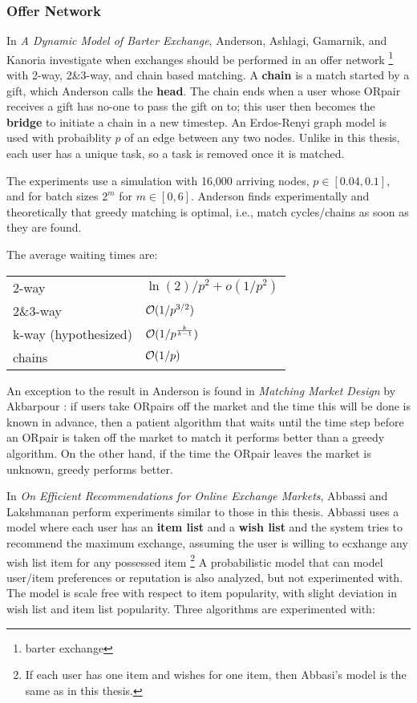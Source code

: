 \documentclass[main.tex]{subfiles}
\begin{document}
\subsubsection{Offer Network}

In \textit{A Dynamic Model of Barter Exchange}, Anderson, Ashlagi, Gamarnik, and Kanoria \cite{And1} investigate when exchanges should be performed in an offer network \footnote{barter exchange} with 2-way, 2\&3-way, and chain based matching. A \textbf{chain} is a match started by a gift, which Anderson calls the \textbf{head}. The chain ends when a user whose ORpair receives a gift has no-one to pass the gift on to; this user then becomes the \textbf{bridge} to initiate a chain in a new timestep. An Erdos-Renyi graph model \cite{Erdos} is used with probaiblity $p$ of an edge between any two nodes. Unlike in this thesis, each user has a unique task, so a task is removed once it is matched.

The experiments use a simulation with 16,000 arriving nodes, $p \in [0.04, 0.1]$, and for batch sizes $2^m$ for $m \in [0,6]$. Anderson finds experimentally and theoretically  that greedy matching is optimal, i.e., match cycles/chains as soon as they are found.

The average waiting times are:
\begin{center}
  \begin{tabular}{| l | l |}
    \hline
    2-way    & $\ln(2)/p^2 + o(1/p^2)$ \\
    2\&3-way & $\mathcal{O}(1/p^{3/2})$ \\
    k-way (hypothesized) & $\mathcal{O}(1/p^{\frac{k}{k-1}})$ \\
    chains   & $\mathcal{O}(1/p)$ \\
    \hline
  \end{tabular}
\end{center}

An exception to the result in Anderson \cite{And1} is found in \textit{Matching Market Design} by Akbarpour \cite{Akb1}: if users take ORpairs off the market and the time this will be done is known in advance, then a patient algorithm that waits until the time step before an ORpair is taken off the market to match it performs better than a greedy algorithm. On the other hand, if the time the ORpair leaves the market is unknown, greedy performs better.

In \textit{On Efficient Recommendations for Online Exchange Markets}, Abbassi and Lakshmanan \cite{Abb1} perform experiments similar to those in this thesis. Abbassi uses a model where each user has an \textbf{item list} and a \textbf{wish list} and the system tries to recommend the maximum exchange, assuming the user is willing to ecxhange any wish list item for any possessed item \footnote{If each user has one item and wishes for one item, then Abbasi's model is the same as in this thesis.} A probabilistic model that can model user/item preferences or reputation is also analyzed, but not experimented with. The model is scale free with respect to item popularity, with slight deviation in wish list and item list popularity. Three algorithms are experimented with:
\end{document}

